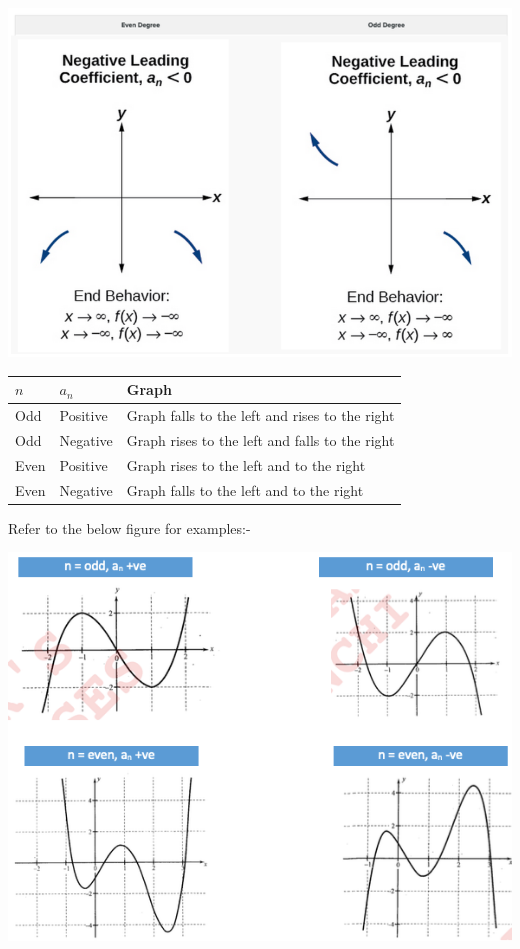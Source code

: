 \documentclass{book}
\begin{document}
	\includegraphics[scale=0.5]{evenodd2}
	
	
	\begin{table}[ht]
		\begin{tabular}{|l| l| l|  }
			\hline
			\textbf{$n$} & \textbf{$a_n$} & Graph\\
			\hline
			Odd & Positive & Graph falls to the left and rises to the right\\
			\hline
			Odd & Negative & Graph rises to the left and falls to the right\\
			\hline
			Even & Positive & Graph rises to the left and to the right \\
			\hline
			Even& Negative & Graph falls to the left and to the right \\
			\hline
		\end{tabular}
	\end{table}

	Refer to the below figure for examples:-

	\includegraphics[scale=0.7]{polynomialg}
	
\end{document}
